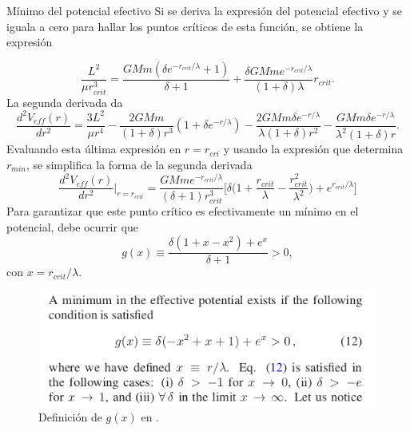 \documentclass{beamer}
\begin{document}
	\begin{frame}[allowframebreaks]{Mínimo del potencial efectivo}
	Si se deriva la expresión del potencial efectivo y se iguala a cero para hallar los puntos críticos de esta función, se obtiene la expresión
	
	\begin{equation}
	\frac{L^2}{\mu r_{crit}^3}=\frac{GMm(\delta e^{-r_{crit}/\lambda}+1)}{\delta+1}+\frac{\delta GMme^{-r_{crit}/\lambda}}{(1+\delta)\lambda}r_{crit}.
	\end{equation}
	La segunda derivada da
	\begin{dmath}
	\frac{d^2V_{eff}(r)}{dr^2}=\frac{3L^2}{\mu r^4}-\frac{2GMm}{(1+\delta)r^3}(1+\delta e^{-r/\lambda})-\frac{2GMm\delta e^{-r/\lambda}}{\lambda (1+\delta)r^2}-\frac{GMm\delta e^{-r/\lambda}}{\lambda^2 (1+\delta)r}.
	\end{dmath}
	Evaluando esta última expresión en $r=r_{cri}$ y usando la expresión que determina $r_{min}$, se simplifica la forma de la segunda derivada
	\begin{equation}
	\frac{d^2V_{eff}(r)}{dr^2}\Bigg|_{r=r_{crit}}=\frac{GMme^{-r_{crit}/\lambda}}{(\delta+1)r_{crit}^3}\Bigg[\delta\Big(1+\frac{r_{crit}}{\lambda}-\frac{r_{crit}^2}{\lambda^2} \Big)+e^{r_{crit}/\lambda} \Bigg]
	\end{equation}
	Para garantizar que este punto crítico es efectivamente un mínimo en el potencial, debe ocurrir que
	\begin{equation}
	g(x)\equiv \frac{\delta(1+x-x^2)+e^x}{\delta+1}>0,
	\end{equation}
	con $x=r_{crit}/\lambda.$
	
	\begin{figure}
	\centering
	\includegraphics[width=.7\textwidth]{ar3.png}
	\caption{Definición de $g(x)$ en \cite{main}.}
	\end{figure}
	\end{frame}
	
\end{document}
